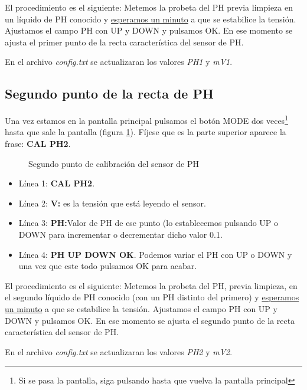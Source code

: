 El procedimiento es el siguiente: Metemos la probeta del PH previa limpieza en un líquido de PH conocido y \underline{esperamos un minuto} a que se estabilice la tensión. Ajustamos el campo PH con UP y DOWN y pulsamos OK. En ese momento se ajusta el primer punto de la recta característica del sensor de PH. 

En el archivo \emph{config.txt} se actualizaran los valores \emph{PH1} y \emph{mV1}.

\subsection{Segundo punto de la recta de PH}

Una vez estamos en la pantalla principal pulsamos el botón MODE dos veces\footnote{Si se pasa la pantalla, siga pulsando hasta que vuelva la pantalla principal} hasta que sale la pantalla (figura \ref{patalla:PH2}). Fíjese que es la parte superior aparece la frase: \textbf{CAL PH2}.

\begin{figure}[htbp!] 
\caption{Segundo punto de calibración del sensor de PH}\label{patalla:PH2} 
\end{figure}

\begin{itemize}
\item Línea 1: \textbf{CAL PH2}.
\item Línea 2: \textbf{V:} es la tensión que está leyendo el sensor.
\item Línea 3: \textbf{PH:}Valor de PH de ese punto (lo establecemos pulsando UP o DOWN para incrementar o decrementar dicho valor 0.1. 
\item Línea 4: \textbf{PH UP DOWN OK}. Podemos variar el PH con UP o DOWN y una vez que este todo pulsamos OK para acabar.
\end{itemize}

El procedimiento es el siguiente: Metemos la probeta del PH, previa limpieza, en el segundo líquido de PH conocido (con un  PH distinto del primero) y \underline{esperamos un minuto} a que se estabilice la tensión. Ajustamos el campo PH con UP y DOWN y pulsamos OK. En ese momento se ajusta el segundo punto de la recta característica del sensor de PH. 

En el archivo \emph{config.txt} se actualizaran los valores \emph{PH2} y \emph{mV2}.

